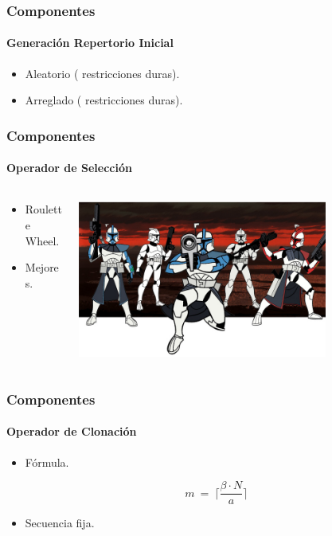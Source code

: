 \frame
{
\frametitle{Componentes}
\framesubtitle{Generación Repertorio Inicial}

\begin{itemize}
	\item Aleatorio ( restricciones duras).
	\item Arreglado ( restricciones duras).
\end{itemize}
}


\frame
{
\frametitle{Componentes}
\framesubtitle{Operador de Selección}
\begin{columns}
	\begin{column}{0.5\textwidth}
		\begin{itemize}
			\item Roulette Wheel.
			\item Mejores.
		\end{itemize}
	\end{column}
	\begin{column}{0.5\textwidth}
		\includegraphics[width=0.75\textwidth]{img/clones}
	\end{column}
\end{columns}
}


\frame
{
\frametitle{Componentes}
\framesubtitle{Operador de Clonación}
\begin{itemize}
	\item Fórmula.
	
		 $$m\ =\ \lceil\frac{\beta \cdot N}{a}\rceil$$
	\item Secuencia fija.
\end{itemize}
}


